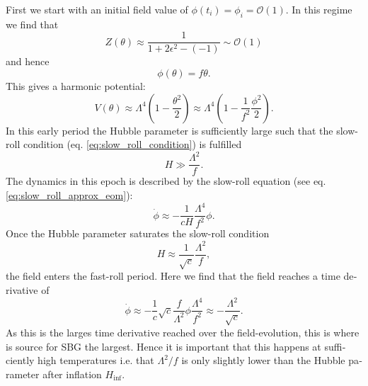 \documentclass[master,       %
               twoside,        %
               BCOR10mm,       %
               english,ngerman, %
               ]{GAUBM}
\begin{document}
\begin{otherlanguage}{english}
First we start with an initial field value of $\phi(t_i) = \phi_i = \mathcal{O}(1)$.
In this regime we find that
\begin{equation}
	Z(\theta) \approx \frac{1}{1 + 2\epsilon^2 - (-1)} \sim \mathcal{O}(1)
\end{equation}
and hence
\begin{equation}
	\phi(\theta) = f \theta.
\end{equation}
This gives a harmonic potential:
\begin{equation}
	V(\theta) \approx \Lambda^4\left(1 - \frac{\theta^2}{2}\right) \approx \Lambda^4\left(1 - \frac{1}{f^2} \frac{\phi^2}{2}\right).
\end{equation}
In this early period the Hubble parameter is sufficiently large such that the slow-roll condition (eq. \eqref{eq:slow_roll_condition}) is fulfilled
\begin{equation}
	H \gg \frac{\Lambda^2}{f}.
\end{equation}
The dynamics in this epoch is described by the slow-roll equation (see eq. \eqref{eq:slow_roll_approx_eom}):
\begin{equation}
	\dot{\phi} \approx - \frac{1}{c H} \frac{\Lambda^4}{f^2} \phi.
\end{equation}
Once the Hubble parameter saturates the slow-roll condition 
\begin{equation}
	H \approx \frac{1}{\sqrt{c}} \frac{\Lambda^2}{f},
\end{equation}
the field enters the fast-roll period.
Here we find that the field reaches a time derivative of 
\begin{equation}
	\dot{\phi} \approx - \frac{1}{c} \sqrt{c} \frac{f}{\Lambda^2} \phi \frac{\Lambda^4}{f^2} \approx - \frac{\Lambda^2}{\sqrt{c}}.
\end{equation}
As this is the larges time derivative reached over the field-evolution, this is where is source for SBG the largest. 
Hence it is important that this happens at sufficiently high temperatures i.e. that $\Lambda^2/f$ is only slightly lower than the Hubble parameter after inflation $H_\mathrm{inf}$.


\end{otherlanguage}
\end{document}
